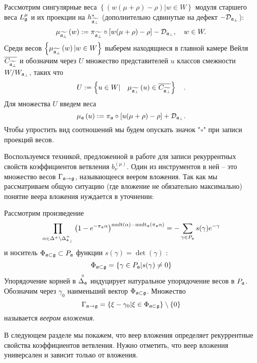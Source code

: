 Рассмотрим сингулярные веса  $\left\{\left( w(\mu +\rho )-\rho \right)|w  \in W \right\}$  модуля старшего веса  $L_{\mathfrak{g}}^{\mu }$ и их проекции на $h_{\widetilde{\mathfrak{a}_{\perp }}}^{\ast }$ (дополнительно сдвинутые на дефект $-\mathcal{D}_{\mathfrak{a}_{\perp }}$):
\begin{equation*}
\mu _{\widetilde{\af_{\perp }}}\left( w\right) :=\pi _{\widetilde{\frak{%
a}_{\perp }}}\circ\left[ w(\mu +\rho )-\rho \right] -\mathcal{D}_{\af_{\perp
}},\quad w\in W.
\end{equation*}
Среди весов  $\left\{\mu _{\widetilde{\mathfrak{a}_{\perp }}}\left( w\right)|w\in W\right\}$ выберем находящиеся в главной камере Вейля $\overline{C_{\widetilde{\mathfrak{a}_{\perp}}}}$ и обозначим через $U$ множество представителей $u$ классов смежности $W/W_{\mathfrak{a}_{\perp }}$, таких что
\begin{equation}
U:=\left\{ u\in W|\quad \mu _{\widetilde{\mathfrak{a}_{\perp }}}\left( u\right)
\in \overline{C_{\widetilde{\mathfrak{a}_{\perp }}}}\right\} \quad .
\label{U-def}
\end{equation}
Для множества  $U$ введем веса
\begin{equation*}
\mu _{\af}\left( u\right) :=\pi _{\af}\circ\left[ u(\mu +\rho )-\rho %
\right] +\mathcal{D}_{\af_{\perp }}.
\end{equation*}
Чтобы упростить вид соотношений мы будем опускать значок "$\circ$" при записи проекций весов.

Воспользуемся техникой, предложенной в работе  \cite{ilyin812pbc} для записи рекуррентных свойств коэффициентов ветвления $b_{\nu}^{(\mu )}$. Один из инструментов в ней -- это множество весов $\Gamma_{\mathfrak{a}\rightarrow \mathfrak{g}}$, называющееся веером вложения. Так как мы рассматриваем общую ситуацию (где вложение не обязательно максимально) понятие веера вложения нуждается в уточнении:
\begin{definition}
\label{fan-definition} Рассмотрим произведение
\begin{equation}
\prod_{\alpha \in \Delta ^{+}\setminus \Delta _{\afb }^{+}}\left( 1-e^{-\pi
_{\af}\alpha }\right) ^{\mathrm{mult}(\alpha )-\mathrm{mult}_{\af%
}(\pi _{\af}\alpha )}=-\sum_{\gamma \in P_{\af}}s(\gamma
)e^{-\gamma }  \label{eq:6}
\end{equation}
и носитель $\Phi _{\mathfrak{a}\subset \mathfrak{g}}\subset P_{\mathfrak{a}}$ функции $s(\gamma )=\det \left( \gamma \right) $ :
\begin{equation}
\Phi _{\mathfrak{a}\subset \mathfrak{g}}=\left\{ \gamma \in P_{\mathfrak{a}}|s(\gamma
)\neq 0\right\}   \label{eq:37}
\end{equation}
Упорядочение корней в  $\stackrel{\circ }{\Delta _{\mathfrak{a}}}$ индуцирует натуральное упорядочение весов в $P_{\mathfrak{a}}$. Обозначим через $\gamma_{0}$ наименьший вектор $\Phi _{\mathfrak{a}\subset \mathfrak{g}}$. Множество
\begin{equation}
\Gamma _{\af\rightarrow \gf}=\left\{ \xi -\gamma _{0}|\xi \in \Phi _{%
\af\subset \gf}\right\} \setminus \left\{ 0\right\}
\label{fan-defined}
\end{equation}
называется  \textit{веером вложения}.
\end{definition}
В следующем разделе мы покажем, что веер вложения определяет рекуррентные свойства коэффициентов ветвления. Нужно отметить, что веер вложения универсален и зависит только от вложения. 

